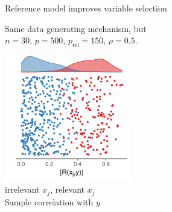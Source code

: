 \documentclass[english,t]{beamer}
\begin{document}
\begin{frame}{}

  {\Large\color{navyblue} Reference model improves variable selection}

  Same data generating mechanism, but\\ $n=30$, $p=500$, $p_\text{rel}=150$, $\rho=0.5$.

  \includegraphics[width=5.5cm]{toy_corr1.pdf}\\
  \vspace{-0.2cm}
  \hspace{0.5cm} {\color{set12} irrelevant $x_j$}, {\color{set11} relevant $x_j$}\\
  \vspace{0.2cm}
  \hspace{0.5cm} Sample correlation with $y$\\
  
\end{frame}
\end{document}
